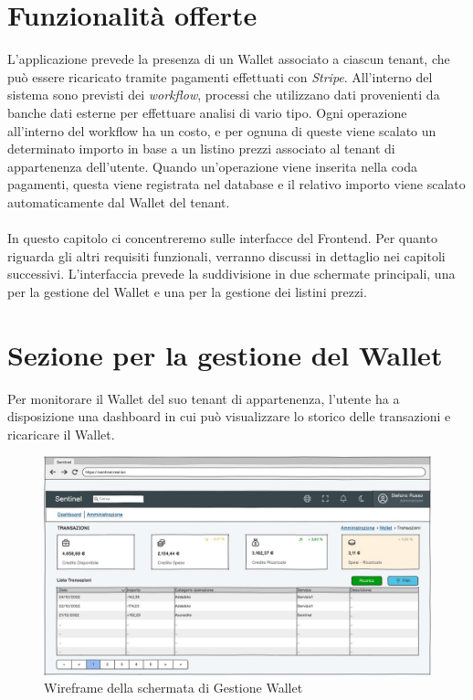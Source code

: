 \section{Funzionalit\`a offerte}
L'applicazione prevede la presenza di un Wallet associato a ciascun tenant, che pu\`o essere ricaricato tramite pagamenti effettuati con \textit{Stripe}.
All'interno del sistema sono previsti dei \textit{workflow}, processi che utilizzano dati provenienti da banche dati esterne per effettuare analisi di vario tipo.
Ogni operazione all'interno del workflow ha un costo, e per ognuna di queste viene scalato un determinato importo in base a un listino prezzi associato al tenant di appartenenza dell'utente.
Quando un'operazione viene inserita nella coda pagamenti, questa viene registrata nel database e il relativo importo viene scalato automaticamente dal Wallet del tenant.\\\\
In questo capitolo ci concentreremo sulle interfacce del Frontend. Per quanto riguarda gli altri requisiti funzionali, verranno discussi in dettaglio nei capitoli successivi.
L'interfaccia prevede la suddivisione in due schermate principali, una per la gestione del Wallet e una per la gestione dei listini prezzi.

\section{Sezione per la gestione del Wallet}
Per monitorare il Wallet del suo tenant di appartenenza, l'utente ha a disposizione una dashboard in cui pu\`o visualizzare lo storico delle transazioni e ricaricare il Wallet.

\begin{figure}[H]
  \centering
  \includegraphics[width=14cm]{images/gestione-wallet/mock-gestione-wallet.png}
  \caption{Wireframe della schermata di Gestione Wallet}
\end{figure}


